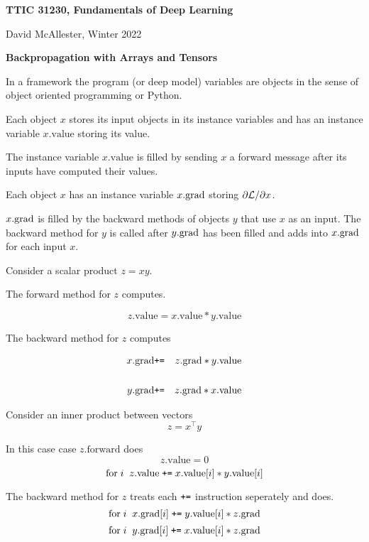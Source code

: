 




{\Huge
  
  \centerline{\bf TTIC 31230, Fundamentals of Deep Learning}
  \bigskip
  \centerline{David McAllester, Winter 2022}
  \vfill
  \vfill
  \centerline{\bf Backpropagation with Arrays and Tensors}
  \vfill
  \vfill



\vfill
In a framework the program (or deep model) variables are objects in the sense of object oriented programming or Python.

\vfill
Each object $x$ stores its input objects in its instance variables and has an instance variable $x.\mathrm{value}$ storing its value.

\vfill
The instance variable $x.\mathrm{value}$ is filled by sending $x$ a forward message after its inputs have computed their values.

\vfill
Each object $x$ has an instance variable $x.\mathrm{grad}$ storing $\partial {\cal L}/\partial x$.

\vfill
$x.\mathrm{grad}$ is filled by the backward methods of objects $y$ that
use $x$ as an input.  The backward method for $y$ is called after $y.\mathrm{grad}$ has been filled and adds into $x.\mathrm{grad}$ for each input $x$.


Consider a scalar product $z = xy$.

\vfill
The forward method for $z$ computes.

$$z.\mathrm{value} = x.\mathrm{value}*y.\mathrm{value}$$

\vfill
The backward method for $z$ computes

\begin{eqnarray*}
x.\mathrm{grad} & \mbox{\tt +=} & z.\mathrm{grad} * y.\mathrm{value} \\
\\
y.\mathrm{grad} & \mbox{\tt +=} & z.\mathrm{grad} * x.\mathrm{value}
\end{eqnarray*}


Consider an inner product between vectors
$$z = x^\top y$$

\vfill
In this case case $z.\mathrm{forward}$ does
$$z.\mathrm{value} = 0$$
$$\mathrm{for}\;i\;\;z.\mathrm{value} \;\mbox{\tt +=}\;x.\mathrm{value}[i]*y.\mathrm{value}[i]$$

\vfill
The backward method for $z$  treats each $\mbox{\tt +=}$ instruction seperately and does.
$$\mathrm{for}\;i\;\;x.\mathrm{grad}[i] \;\mbox{\tt +=}\;y.\mathrm{value}[i]*z.\mathrm{grad}$$
$$\mathrm{for}\;i\;\;y.\mathrm{grad}[i] \;\mbox{\tt +=}\;x.\mathrm{value}[i]*z.\mathrm{grad}$$

}
